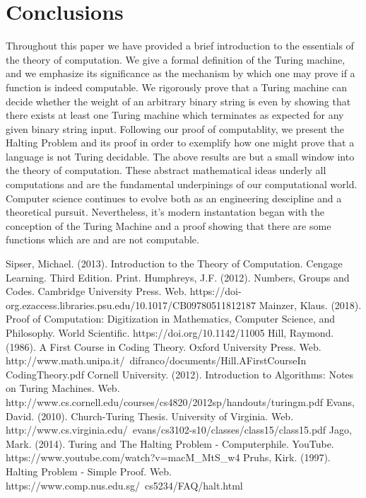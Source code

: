 \documentclass{article}
\begin{document}
\section{Conclusions}
Throughout this paper we have provided a brief introduction to the essentials of the theory of computation. We give a formal definition of the Turing machine, and we emphasize its significance as the mechanism by which one may prove if a function is indeed computable.  We rigorously prove that a Turing machine can decide whether the weight of an arbitrary binary string is even by showing that there exists at least one Turing machine which terminates as expected for any given binary string input.  Following our proof of computablity, we present the Halting Problem and its proof in order to exemplify how one might prove that a language is not Turing decidable.  The above results are but a small window into the theory of computation.  These abstract mathematical ideas underly all computations and are the fundamental underpinings of our computational world.  Computer science continues to evolve both as an engineering descipline and a theoretical pursuit.  Nevertheless, it's modern instantation began with the conception of the Turing Machine and a proof showing that there are some functions which are and are not computable.

\begin{thebibliography}{100}
	 Sipser, Michael. (2013). Introduction to the Theory of Computation. Cengage Learning. Third Edition. Print.
	 Humphreys, J.F. (2012). Numbers, Groups and Codes. Cambridge University Press. Web. https://doi-org.ezaccess.libraries.psu.edu/10.1017/CB09780511812187
	 Mainzer, Klaus. (2018). Proof of Computation: Digitization in Mathematics, Computer Science, and Philosophy. World Scientific. https://doi.org/10.1142/11005
	 Hill, Raymond. (1986). A First Course in Coding Theory. Oxford University Press. Web. http://www.math.unipa.it/~difranco/documents/Hill.AFirstCourseIn
\newline CodingTheory.pdf
	 Cornell University. (2012). Introduction to Algorithms: Notes on Turing Machines. Web. http://www.cs.cornell.edu/courses/cs4820/2012sp/handouts/turingm.pdf
	 Evans, David. (2010). Church-Turing Thesis. University of Virginia. Web. http://www.cs.virginia.edu/~evans/cs3102-s10/classes/class15/class15.pdf
	 Jago, Mark. (2014). Turing and The Halting Problem - Computerphile. YouTube. https://www.youtube.com/watch?v=macM\_MtS\_w4
	 Pruhs, Kirk. (1997). Halting Problem - Simple Proof. Web. https://www.comp.nus.edu.sg/~cs5234/FAQ/halt.html
\end{thebibliography}
\end{document}

